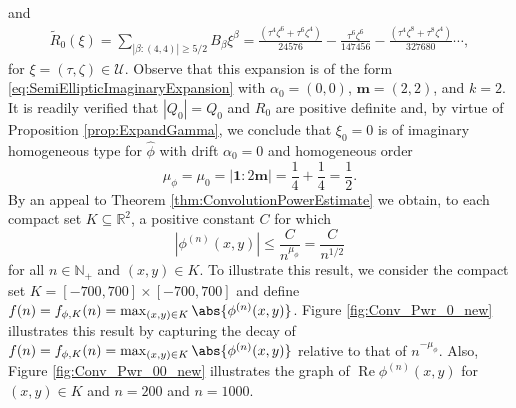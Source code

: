 \documentclass[11pt, letter]{book}
\newenvironment{example}
  {\pushQED{\qed}\renewcommand{\qedsymbol}{$\triangle$}\examplex}
  {\popQED\endexamplex}
\renewcommand\Re{\operatorname{Re}}%
\newcommand{\f}[2]{\frac{#1}{#2}}
\begin{document}
\begin{example}
and
\begin{eqnarray*}
\widetilde{R}_{0}(\xi)=\sum_{|\beta:(4,4)|\geq 5/2}B_\beta \xi^\beta 
=\f{(\tau^4\zeta^6 + \tau^6\zeta^4)}{24576} - \f{\tau^6\zeta^6}{147456} - \f{(\tau^4\zeta^8 + \tau^8\zeta^4)}{327680}
\cdots, 
\end{eqnarray*}
for $\xi=(\tau,\zeta)\in\mathcal{U}$. Observe that this expansion is of the form \eqref{eq:SemiEllipticImaginaryExpansion} with $\alpha_0=(0,0)$, $\mathbf{m}=(2,2)$, and $k=2$. It is readily verified that $|Q_0|=Q_0$ and $R_0$ are positive definite and, by virtue of Proposition \ref{prop:ExpandGamma}, we conclude that $\xi_0=0$ is of imaginary homogeneous type for $\widehat\phi$ with drift $\alpha_0=0$ and homogeneous order
\begin{equation*}
    \mu_{\phi}=\mu_0=|\mathbf{1}:2\mathbf{m}|=\frac{1}{4}+\frac{1}{4}=\f{1}{2}.
\end{equation*}
By an appeal to Theorem \ref{thm:ConvolutionPowerEstimate} we obtain, to each compact set $K\subseteq\mathbb{R}^2$, a positive constant $C$ for which
\begin{equation}\label{eq:SecondOrderExampleDecay}
    |\phi^{(n)}(x,y)|\leq \frac{C}{n^{\mu_\phi}}=\frac{C}{n^{1/2}}
\end{equation}
for all $n\in\mathbb{N}_+$ and $(x,y)\in K$. To illustrate this result, we consider the compact set $K = [-700, 700] \times [-700, 700]$ and define $f(n)=f_{\phi,K}(n)=\max_{(x,y)\in K}\abs{\phi^{(n)}(x,y)}$. Figure \ref{fig:Conv_Pwr_0_new} illustrates this result by capturing the decay of $f(n)=f_{\phi,K}(n)=\max_{(x,y)\in K}\abs{\phi^{(n)}(x,y)}$ relative to that of $n^{-\mu_\phi}$. Also, Figure \ref{fig:Conv_Pwr_00_new} illustrates the graph of $\Re \phi^{(n)}(x,y)$ for $(x,y)\in K$ and $n=200$ and $n=1000$.



\end{example}
\end{document}
